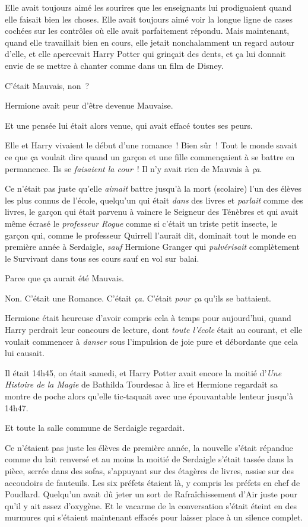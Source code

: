 Elle avait toujours aimé les sourires que les enseignants lui prodiguaient quand elle faisait bien les choses.
Elle avait toujours aimé voir la longue ligne de cases cochées sur les contrôles où elle avait parfaitement répondu.
Mais maintenant, quand elle travaillait bien en cours, elle jetait nonchalamment un regard autour d'elle, et elle apercevait Harry Potter qui grinçait des dents, et ça lui donnait envie de se mettre à chanter comme dans un film de Disney.

C'était Mauvais, non~?

Hermione avait peur d'être devenue Mauvaise.

Et une pensée lui était alors venue, qui avait effacé toutes ses peurs.

Elle et Harry vivaient le début d'une romance~!
Bien sûr~!
Tout le monde savait ce que ça voulait dire quand un garçon et une fille commençaient à se battre en permanence.
Ils se \emph{faisaient la cour}~!
Il n'y avait rien de Mauvais à \emph{ça}.

Ce n'était pas juste qu'elle \emph{aimait} battre jusqu'à la mort (scolaire) l'un des élèves les plus connus de l'école, quelqu'un qui était \emph{dans} des livres et \emph{parlait} comme des livres, le garçon qui était parvenu à vaincre le Seigneur des Ténèbres et qui avait même écrasé le \emph{professeur Rogue} comme si c'était un triste petit insecte, le garçon qui, comme le professeur Quirrell l'aurait dit, dominait tout le monde en première année à Serdaigle, \emph{sauf} Hermione Granger qui \emph{pulvérisait} complètement le Survivant dans tous ses cours sauf en vol sur balai.

Parce que ça aurait été Mauvais.

Non. C'était une Romance.
C'était \emph{ça}.
C'était \emph{pour ça} qu'ils se battaient.

Hermione était heureuse d'avoir compris cela à temps pour aujourd'hui, quand Harry perdrait leur concours de lecture, dont \emph{toute l'école} était au courant, et elle voulait commencer à \emph{danser} sous l'impulsion de joie pure et débordante que cela lui causait.

Il était 14h45, on était samedi, et Harry Potter avait encore la moitié d'\emph{Une Histoire de la Magie} de Bathilda Tourdesac à lire et Hermione regardait sa montre de poche alors qu'elle tic-taquait avec une épouvantable lenteur jusqu'à 14h47.

Et toute la salle commune de Serdaigle regardait.

Ce n'étaient pas juste les élèves de première année, la nouvelle s'était répandue comme du lait renversé et au moins la moitié de Serdaigle s'était tassée dans la pièce, serrée dans des sofas, s'appuyant sur des étagères de livres, assise sur des accoudoirs de fauteuils.
Les six préfets étaient là, y compris les préfets en chef de Poudlard.
Quelqu'un avait dû jeter un sort de Rafraîchissement d'Air juste pour qu'il y ait assez d'oxygène.
Et le vacarme de la conversation s'était éteint en des murmures qui s'étaient maintenant effacés pour laisser place à un silence complet.

